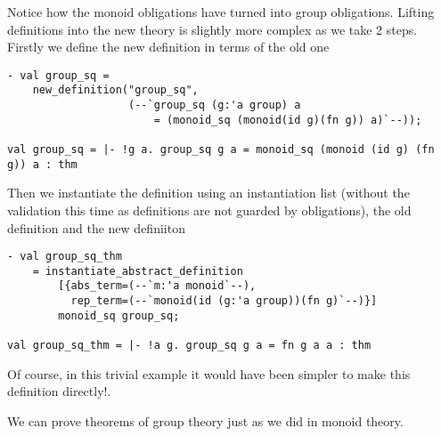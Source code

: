 Notice how the monoid obligations have turned into group obligations.
Lifting definitions into the new theory is slightly more complex as we take
2 steps. Firstly we define the new definition in terms of the old one

\begin{small}
\begin{verbatim}
- val group_sq =
    new_definition("group_sq",
                   (--`group_sq (g:'a group) a 
                       = (monoid_sq (monoid(id g)(fn g)) a)`--));

val group_sq = |- !g a. group_sq g a = monoid_sq (monoid (id g) (fn g)) a : thm
\end{verbatim}
\end{small}

Then we instantiate the definition using an instantiation list (without the
validation this time as definitions are not guarded by obligations), the old
definition and the new definiiton

\begin{small}
\begin{verbatim}
- val group_sq_thm 
    = instantiate_abstract_definition 
        [{abs_term=(--`m:'a monoid`--),
          rep_term=(--`monoid(id (g:'a group))(fn g)`--)}]
        monoid_sq group_sq;

val group_sq_thm = |- !a g. group_sq g a = fn g a a : thm
\end{verbatim}
\end{small}

Of course, in this trivial example it would have been simpler to make this
definition directly!.

We can prove theorems of group theory just as we did in monoid theory.

